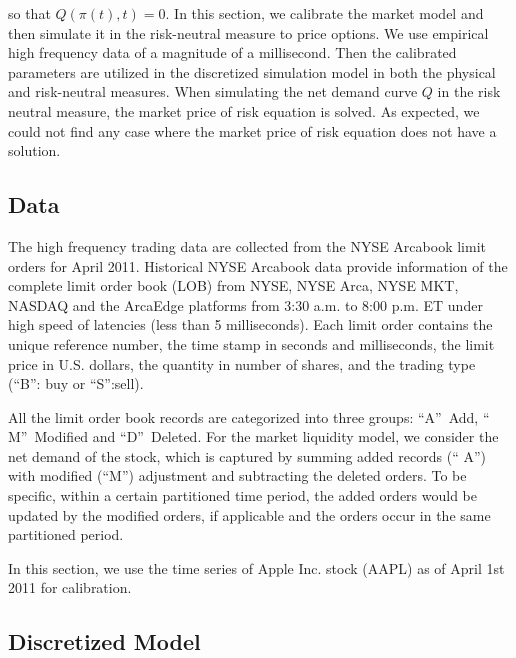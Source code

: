 \documentclass{article}
\begin{document}
so that $Q(\pi (t),t)=0$. In this section, we calibrate the market model and
then simulate it in the risk-neutral measure to price options. We use
empirical high frequency data of a magnitude of a millisecond. Then the
calibrated parameters are utilized in the discretized simulation model in
both the physical and risk-neutral measures. When simulating the net demand
curve $Q$ in the risk neutral measure, the market price of risk equation is
solved. As expected, we could not find any case where the market price of
risk equation does not have a solution.

\subsection{Data}

The high frequency trading data are collected from the NYSE Arcabook limit
orders for April 2011. Historical NYSE Arcabook data provide information of
the complete limit order book (LOB) from NYSE, NYSE Arca, NYSE MKT, NASDAQ
and the ArcaEdge platforms from 3:30 a.m. to 8:00 p.m. ET under high speed
of latencies (less than 5 milliseconds). Each limit order contains the
unique reference number, the time stamp in seconds and milliseconds, the
limit price in U.S. dollars, the quantity in number of shares, and the
trading type (\textquotedblleft B\textquotedblright : buy or
\textquotedblleft S\textquotedblright :sell).

All the limit order book records are categorized into three groups:
\textquotedblleft A\textquotedblright\ Add, \textquotedblleft
M\textquotedblright\ Modified and \textquotedblleft D\textquotedblright\
Deleted. For the market liquidity model, we consider the net demand of the
stock, which is captured by summing added records (\textquotedblleft
A\textquotedblright ) with modified (\textquotedblleft M\textquotedblright )
adjustment and subtracting the deleted orders. To be specific, within a
certain partitioned time period, the added orders would be updated by the
modified orders, if applicable and the orders occur in the same partitioned
period.

In this section, we use the time series of Apple Inc. stock (AAPL) as of
April 1st 2011 for calibration.

\bigskip

\subsection{Discretized Model}
\end{document}
